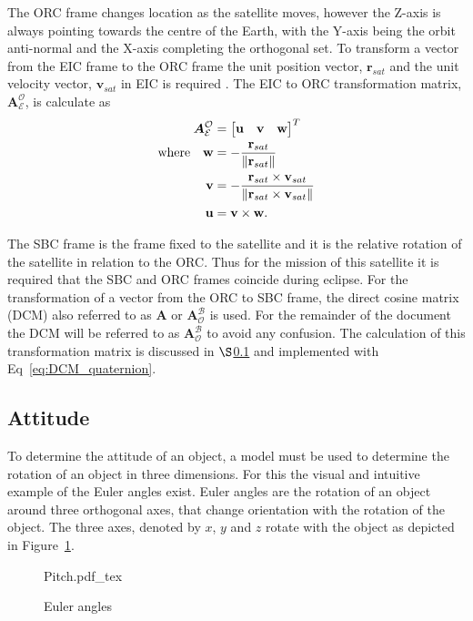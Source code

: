The ORC frame changes location as the satellite moves, however the Z-axis is always pointing towards the centre of the Earth, with the Y-axis being the orbit anti-normal and the X-axis completing the orthogonal set. To transform a vector from the EIC frame to the ORC frame the unit position vector, $\mathbf{r}_{sat}$ and the unit velocity vector, $\mathbf{v}_{sat}$ in EIC is required \cite{Chen_ground-target}. The EIC to ORC transformation matrix, $\boldsymbol{A}^{\mathcal{O}}_{\mathcal{E}}$, is calculate as
\begin{equation}
\label{Eq: ORC to EIC}
\begin{aligned}
	\boldsymbol{A}^{\mathcal{O}}_{\mathcal{E}} &= 
	\begin{bmatrix}
		\mathbf{u} & \mathbf{v} & \mathbf{w}\\
	\end{bmatrix}^T \\
\text{where} \quad
\mathbf{w} &= -\frac{\mathbf{r}_{sat}}{\left\lVert\mathbf{r}_{sat}\right\rVert} \\
\mathbf{v} &= -\frac{\mathbf{r}_{sat} \times \mathbf{v}_{sat}}{\left\lVert\mathbf{r}_{sat} \times \mathbf{v}_{sat}\right\rVert} \\
\mathbf{u} &= \mathbf{v} \times \mathbf{w}. \\
\end{aligned}
\end{equation}

The SBC frame is the frame fixed to the satellite and it is the relative rotation of the satellite in relation to the ORC. Thus for the mission of this satellite it is required that the SBC and ORC frames coincide during eclipse. For the transformation of a vector from the ORC to SBC frame, the direct cosine matrix (DCM) also referred to as $\boldsymbol{A}$ or $\boldsymbol{A}^{\mathcal{B}}_{\mathcal{O}}$ is used. For the remainder of the document the DCM will be referred to as $\boldsymbol{A}^{\mathcal{B}}_{\mathcal{O}}$ to avoid any confusion. The calculation of this transformation matrix is discussed in $\S$\ref{subsection_quaternions} and implemented with Eq~\ref{eq:DCM_quaternion}.


\subsection{Attitude}
\label{subsection_quaternions}
To determine the attitude of an object, a model must be used to determine the rotation of an object in three dimensions. For this the visual and intuitive example of the Euler angles exist. Euler angles are the rotation of an object around three orthogonal axes, that change orientation with the rotation of the object. The three axes, denoted by $x$, $y$ and $z$ rotate with the object as depicted in Figure~\ref{fig:Pitch}.
\begin{figure}[!htb]
	\centering
	\def\svgwidth{10cm}
	{Pitch.pdf_tex}
	\caption{Euler angles}
	\label{fig:Pitch}
\end{figure}

